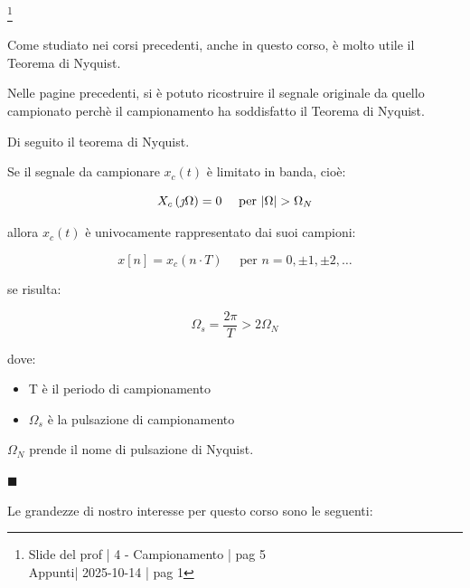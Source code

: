 \footnote{ 
    Slide del prof | 4 - Campionamento | pag 5\\
    Appunti| 2025-10-14 | pag 1
}

\begin{tcolorbox}
    Come studiato nei corsi precedenti, anche in questo corso, è molto utile il Teorema di Nyquist. 
\end{tcolorbox} 

Nelle pagine precedenti, si è potuto ricostruire il segnale originale da quello campionato perchè il campionamento ha soddisfatto il Teorema di Nyquist. \newline 

Di seguito il teorema di Nyquist. \newline 

Se il segnale da campionare $x_c \left(t\right)$ è limitato in banda, cioè: 

{
    \Large 
    \begin{equation}
        X_c \left(\jmath \Omega\right) = 0 \quad \text{ per } \abs{\Omega} > \Omega_N
    \end{equation}
}

allora $x_c \left(t\right)$ è univocamente rappresentato dai suoi campioni: 

{
    \Large 
    \begin{equation}
        x \left[n \right]
        = 
        x_c \left(n \cdot T\right) 
        \quad
        \text{ per }
        n = 0, \pm 1, \pm 2, \dots
    \end{equation}
}

se risulta: 

{
    \Large 
    \begin{equation}
        \Omega_s = \dfrac{2 \pi}{T} 
        > 
        2 \Omega_N
    \end{equation}
}

dove: 

\begin{itemize}
    \item T è il periodo di campionamento 
    \item $\Omega_s$ è la pulsazione di campionamento 
\end{itemize} 

$\Omega_N$ prende il nome di pulsazione di Nyquist. \newline 

$\blacksquare $ \newline 

Le grandezze di nostro interesse per questo corso sono le seguenti: 

